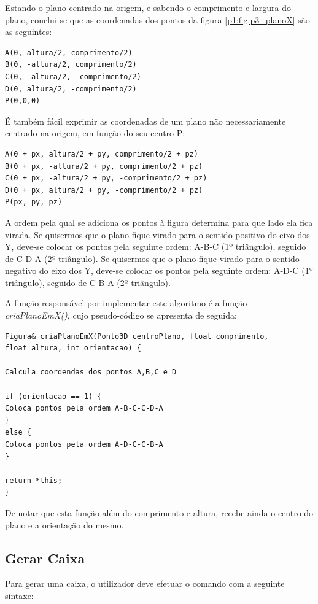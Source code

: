 Estando o plano centrado na origem, e sabendo o comprimento e largura do plano, conclui-se que as coordenadas dos pontos da figura \ref{p1:fig:p3_planoX} são as seguintes:

\begin{Verbatim}
A(0, altura/2, comprimento/2)
B(0, -altura/2, comprimento/2)
C(0, -altura/2, -comprimento/2)
D(0, altura/2, -comprimento/2)
P(0,0,0)
\end{Verbatim}

É também fácil exprimir as coordenadas de um plano não necessariamente centrado na origem, em função do seu centro P:

\begin{Verbatim}
A(0 + px, altura/2 + py, comprimento/2 + pz)
B(0 + px, -altura/2 + py, comprimento/2 + pz)
C(0 + px, -altura/2 + py, -comprimento/2 + pz)
D(0 + px, altura/2 + py, -comprimento/2 + pz)
P(px, py, pz)
\end{Verbatim}

A ordem pela qual se adiciona os pontos à figura determina para que lado ela fica virada. Se quisermos que o plano fique virado para o sentido positivo do eixo dos Y, deve-se colocar os pontos pela seguinte ordem: A-B-C (1º triângulo), seguido de C-D-A (2º triângulo). Se quisermos que o plano fique virado para o sentido negativo do eixo dos Y, deve-se colocar os pontos pela seguinte ordem: A-D-C (1º triângulo), seguido de C-B-A (2º triângulo).

A função responsável por implementar este algoritmo é a função \textit{criaPlanoEmX()}, cujo pseudo-código se apresenta de seguida:

\begin{Verbatim}
Figura& criaPlanoEmX(Ponto3D centroPlano, float comprimento, 
float altura, int orientacao) {

Calcula coordendas dos pontos A,B,C e D

if (orientacao == 1) {
Coloca pontos pela ordem A-B-C-C-D-A
}
else {
Coloca pontos pela ordem A-D-C-C-B-A
}

return *this;
}
\end{Verbatim}

De notar que esta função além do comprimento e altura, recebe ainda o centro do plano e a orientação do mesmo.

\newpage
\subsection{Gerar Caixa}

Para gerar uma caixa, o utilizador deve efetuar o comando com a seguinte sintaxe:

